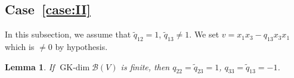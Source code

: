 \documentclass[10pt,a4paper]{amsart}
\numberwithin{equation}{section}
\newtheorem{Lemma}[Theorem]{Lemma}
\newcommand{\GK}{\operatorname{GK-dim}}
\newcommand{\toba}{\mathscr B}
\begin{document}
\subsection[Case~(II)]{Case~\ref{case:II}} In this subsection, we assume that $\widetilde{q}_{12}=1$, $\widetilde{q}_{13} \neq 1$.
We set $v = x_1x_3 - q_{13}x_3x_1$ which is $\neq 0$ by hypothesis.

\begin{Lemma}\label{lemma:caseII-general}
If $\GK \toba(V)$ is finite, then $q_{22} = \widetilde{q}_{23} = 1$, $q_{33} = \widetilde{q}_{13}=-1$.
%
%
%
\end{Lemma}
\end{document}
